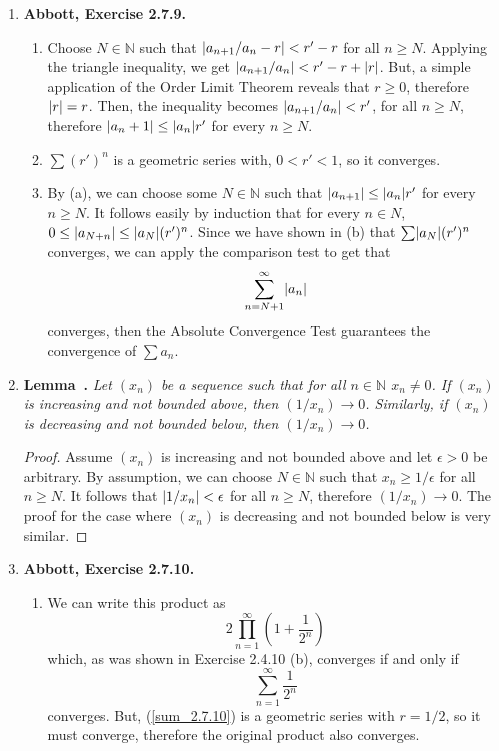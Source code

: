 \documentclass{article}
\newcounter{lemmaCounter}
\newenvironment{shortlemma}[1]{\refstepcounter{lemmaCounter}
\label{#1}\textbf{Lemma~\thelemmaCounter.}\em}
\DeclarePairedDelimiter\abs{\lvert}{\rvert}
\newcommand{\N}{\mathbb{N}}
\newcommand{\ra}{\rightarrow}
\newcommand{\exc}[2][Abbott]{\item \textbf{#1, Exercise #2.}}
\newcommand{\lep}[1][L]{#1et $\epsilon > 0$ be arbitrary}
\begin{document}
\begin{enumerate}
    \exc{2.7.9}
    \begin{enumerate}
        \item Choose $N \in \N$ such that $\abs*{a_{n+1}/a_n - r} < r'- r$ for all $n \geq N$. Applying the triangle inequality, we get $\abs*{a_{n+1}/a_n} < r' -r + \abs*{r}$. But, a simple application of the Order Limit Theorem reveals that $r \geq 0$, therefore $\abs*{r}=r$. Then, the inequality becomes $\abs*{a_{n+1}/a_n} < r'$, for all $n \geq N$, therefore $\abs*{a_n+1} \leq \abs*{a_n} r'$ for every $n \geq N$.
        
        \item $\sum (r')^n$ is a geometric series with, $0 < r' < 1$, so it converges.
        
        \item By (a), we can choose some $N \in \N$ such that $\abs*{a_{n+1}} \leq \abs*{a_n} r'$ for every $n \geq N$. It follows easily by induction that for every $n \in N$, $0 \leq \abs*{a_{N+n}} \leq \abs*{a_N} (r')^n$. Since we have shown in (b) that $\sum \abs*{a_N} (r')^n$ converges, we can apply the comparison test to get that 
        \begin{equation*}
            \sum_{n=N+1}^\infty \abs*{a_n}
        \end{equation*} converges, then the Absolute Convergence Test guarantees the convergence of $\sum a_n$.
    \end{enumerate} 
    
    \item \begin{shortlemma}{lem_1OverInfinityIsZero}
        Let $(x_n)$ be a sequence such that for all $n \in \N$ $x_n \neq 0$.
        If $(x_n)$ is increasing and not bounded above, then $(1/x_n) \ra 0$. Similarly, if $(x_n)$ is decreasing and not bounded below, then $(1/x_n) \ra 0$.
    \end{shortlemma}
    \begin{proof}
        Assume $(x_n)$ is increasing and not bounded above and \lep[l]. By assumption, we can choose $N \in \N$ such that $x_n \geq 1/\epsilon$ for all $n \geq N$. It follows that $\abs*{1/x_n} < \epsilon$ for all $n \geq N$, therefore $(1/x_n) \ra 0$. The proof for the case where $(x_n)$ is decreasing and not bounded below is very similar.
    \end{proof}
    
    \exc{2.7.10}
    \begin{enumerate}
        \item We can write this product as 
        \begin{equation*}
            2  \prod_{n=1}^\infty (1 + \frac{1}{2^n})
        \end{equation*} which, as was shown in Exercise 2.4.10 (b), converges if and only if 
        \begin{equation} \label{sum_2.7.10}
            \sum_{n=1}^\infty \frac{1}{2^n}
        \end{equation} converges. But, (\ref{sum_2.7.10}) is a geometric series with $r = 1/2$, so it must converge, therefore the original product also converges.
        

\end{enumerate}
\end{enumerate}
\end{document}
